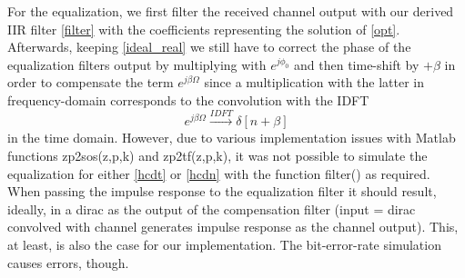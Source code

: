 \documentclass[paper=a4, fontsize=11pt]{scrartcl} %
\numberwithin{equation}{section} %
\numberwithin{figure}{section} %
\numberwithin{table}{section} %
\begin{document}
For the equalization, we first filter the received channel output with our derived IIR filter \eqref{filter} with the coefficients representing the solution of \eqref{opt}. Afterwards, keeping \eqref{ideal_real} we still have to correct the phase of the equalization filters output by multiplying with $e^{j\phi_0}$ and then time-shift by $+\beta$ in order to compensate the term $e^{j\beta\Omega}$ since a multiplication with the latter in frequency-domain corresponds to the convolution with the IDFT
\begin{equation} 
e^{j\beta\Omega}\xrightarrow  {IDFT}\delta[n+\beta]\label{dirac}
\end{equation}
in the time domain.
However, due to various implementation issues with Matlab functions zp2sos(z,p,k) and zp2tf(z,p,k), it was not possible to simulate the equalization for either \eqref{hcdt} or \eqref{hcdn} with the function filter() as required.
When passing the impulse response to the equalization filter it should result, ideally, in a dirac as the output of the compensation filter (input = dirac convolved with channel generates impulse response as the channel output). This, at least, is also the case for our implementation. The bit-error-rate simulation causes errors, though.
\end{document}

